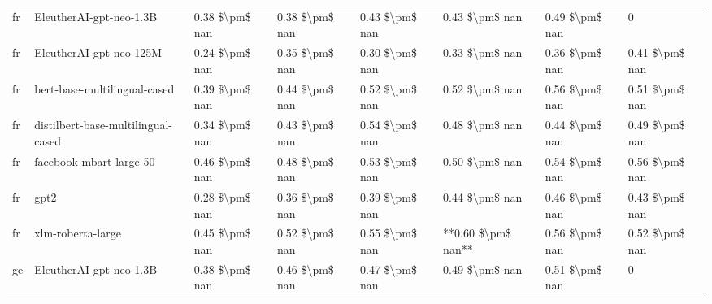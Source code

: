 \begin{tabular}{llllllll}
      fr &            EleutherAI-gpt-neo-1.3B & 0.38 \$\textbackslash pm\$ nan &            0.38 \$\textbackslash pm\$ nan &        0.43 \$\textbackslash pm\$ nan &         0.43 \$\textbackslash pm\$ nan &                          0.49 \$\textbackslash pm\$ nan &                  0 \\
      fr &            EleutherAI-gpt-neo-125M & 0.24 \$\textbackslash pm\$ nan &            0.35 \$\textbackslash pm\$ nan &        0.30 \$\textbackslash pm\$ nan &         0.33 \$\textbackslash pm\$ nan &                          0.36 \$\textbackslash pm\$ nan &     0.41 \$\textbackslash pm\$ nan \\
      fr &       bert-base-multilingual-cased & 0.39 \$\textbackslash pm\$ nan &            0.44 \$\textbackslash pm\$ nan &        0.52 \$\textbackslash pm\$ nan &         0.52 \$\textbackslash pm\$ nan &                          0.56 \$\textbackslash pm\$ nan &     0.51 \$\textbackslash pm\$ nan \\
      fr & distilbert-base-multilingual-cased & 0.34 \$\textbackslash pm\$ nan &            0.43 \$\textbackslash pm\$ nan &        0.54 \$\textbackslash pm\$ nan &         0.48 \$\textbackslash pm\$ nan &                          0.44 \$\textbackslash pm\$ nan &     0.49 \$\textbackslash pm\$ nan \\
      fr &            facebook-mbart-large-50 & 0.46 \$\textbackslash pm\$ nan &            0.48 \$\textbackslash pm\$ nan &        0.53 \$\textbackslash pm\$ nan &         0.50 \$\textbackslash pm\$ nan &                          0.54 \$\textbackslash pm\$ nan &     0.56 \$\textbackslash pm\$ nan \\
      fr &                               gpt2 & 0.28 \$\textbackslash pm\$ nan &            0.36 \$\textbackslash pm\$ nan &        0.39 \$\textbackslash pm\$ nan &         0.44 \$\textbackslash pm\$ nan &                          0.46 \$\textbackslash pm\$ nan &     0.43 \$\textbackslash pm\$ nan \\
      fr &                  xlm-roberta-large & 0.45 \$\textbackslash pm\$ nan &            0.52 \$\textbackslash pm\$ nan &        0.55 \$\textbackslash pm\$ nan &     **0.60 \$\textbackslash pm\$ nan** &                          0.56 \$\textbackslash pm\$ nan &     0.52 \$\textbackslash pm\$ nan \\
      ge &            EleutherAI-gpt-neo-1.3B & 0.38 \$\textbackslash pm\$ nan &            0.46 \$\textbackslash pm\$ nan &        0.47 \$\textbackslash pm\$ nan &         0.49 \$\textbackslash pm\$ nan &                          0.51 \$\textbackslash pm\$ nan &                  0 \\

\end{tabular}
